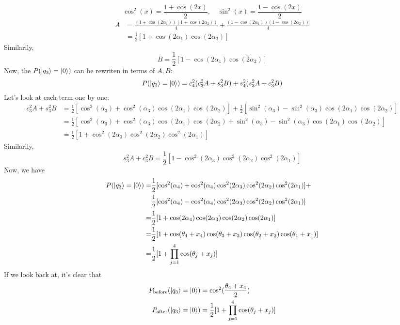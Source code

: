 \documentclass[12pt]{article}
\numberwithin{equation}{section}  %
\theoremstyle{definition}
\theoremstyle{plain}
\theoremstyle{remark}
\begin{document}
\[\cos^2(x)=\frac{1+\cos(2x)}{2},\quad \sin^2(x)=\frac{1-\cos(2x)}{2}\]
\[\begin{aligned}
A&=\frac{(1+\cos(2\alpha_1))(1+\cos(2\alpha_2))}{4}+\frac{(1-\cos(2\alpha_1))(1-\cos(2\alpha_2))}{4}\\
&=\frac{1}{2}[1+\cos(2\alpha_1)\cos(2\alpha_2)]    
\end{aligned}
\]
Similarily,
\[B=\frac{1}{2}[1-\cos(2\alpha_1)\cos(2\alpha_2)]\]
Now, the $P(\ket{q_3}=\ket{0})$ can be rewriten in terms of $A,B$:
\begin{equation}
P(\ket{q_3}=\ket{0})=c^2_4(c^2_3A+s^2_3B)+s^2_4(s^2_3A+c^2_3B)
\end{equation}
Let's look at each term one by one:
\[
\begin{aligned}
c^2_3A+s^2_3B&=\frac{1}{2}[\cos^2(\alpha_3)+\cos^2(\alpha_3)\cos(2\alpha_1)\cos(2\alpha_2)]+
\frac{1}{2}[\sin^2(\alpha_3)-\sin^2(\alpha_3)\cos(2\alpha_1)\cos(2\alpha_2)]\\
&=\frac{1}{2}[\cos^2(\alpha_3)+\cos^2(\alpha_3)\cos(2\alpha_1)\cos(2\alpha_2)+\sin^2(\alpha_3)-\sin^2(\alpha_3)\cos(2\alpha_1)\cos(2\alpha_2)]\\
&=\frac{1}{2}[1+\cos^2(2\alpha_3)\cos^2(2\alpha_2)\cos^2(2\alpha_1)]
\end{aligned}
\]
Similarily, 
\[s^2_3A+c^2_3B=\frac{1}{2}[1-\cos^2(2\alpha_3)\cos^2(2\alpha_2)\cos^2(2\alpha_1)]\]
Now, we have
\begin{equation}
\begin{aligned}   
P(\ket{q_3}=\ket{0})=&\frac{1}{2}[\cos^2(\alpha_4)+\cos^2(\alpha_4)\cos^2(2\alpha_3)\cos^2(2\alpha_2)\cos^2(2\alpha_1)]+\\
&\frac{1}{2}[\cos^2(\alpha_4)-\cos^2(\alpha_4)\cos^2(2\alpha_3)\cos^2(2\alpha_2)\cos^2(2\alpha_1)]\\
=&\frac{1}{2}[1+\cos(2\alpha_4)\cos(2\alpha_3)\cos(2\alpha_2)\cos(2\alpha_1)]\\
=&\frac{1}{2}[1+\cos(\theta_4+x_4)\cos(\theta_3+x_3)\cos(\theta_2+x_2)\cos(\theta_1+x_1)]\\
=&\frac{1}{2}[1+\prod_{j=1}^{4}\cos(\theta_j+x_j)]
\end{aligned}
\end{equation}
If we look back at, it's clear that
\begin{equation}
\begin{aligned}
P_{\text{before}}(\ket{q_3}=\ket{0})&=\cos^2(\frac{\theta_4+x_4}{2})\\
P_{\text{after}}(\ket{q_3}=\ket{0})&=\frac{1}{2}[1+\prod_{j=1}^{4}\cos(\theta_j+x_j)]
\end{aligned}
\end{equation}
\end{document}
